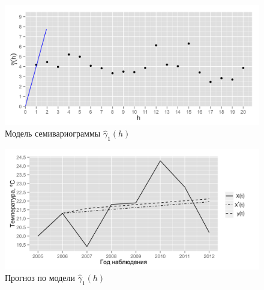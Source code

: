\documentclass[10pt,pdf,aspectratio=169,hyperref={unicode},notheorems]{beamer}
\theoremstyle{definition}
\theoremstyle{example}
\theoremstyle{plain}
\begin{document}
\begin{frame}
\begin{columns}[c]
  \column{3in}
  \vspace{-14.5pt}
  \begin{figure}[H]
    \includegraphics[width=0.9\linewidth]{../../figures/variogram/lin-modeled.png} \\
    \caption{Модель семивариограммы $\widehat{\gamma}_1(h)$}
    \includegraphics[width=0.9\linewidth]{../../figures/variogram/lin-cross-prediction.png}
    \caption{Прогноз по модели $\widehat{\gamma}_1(h)$}
  \end{figure}
  \end{columns}
\end{frame}


\end{document}
